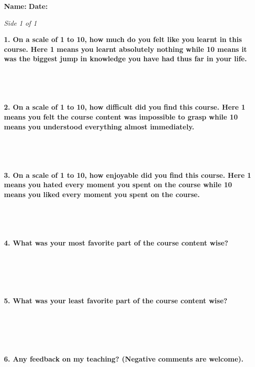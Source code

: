\documentclass[12pt]{article}
\begin{document}
\noindent
\textbf{Name:}\underline{\hspace{6cm}} \hfill \textbf{Date:}\underline{\hspace{3cm}}

\vspace{0.5em}
\noindent\textit{Side 1 of 1}

\vspace{1.5em}
\noindent\textbf{1. On a scale of 1 to 10, how much do you felt like you learnt in this course. Here 1 means you learnt absolutely nothing while 10 means it was the biggest jump in knowledge you have had thus far in your life.}
\\
\\
\\
\\
\\
\noindent\textbf{2. On a scale of 1 to 10, how difficult did you find this course. Here 1 means you felt the course content was impossible to grasp while 10 means you understood everything almost immediately.}
\\
\\
\\
\\
\\
\noindent\textbf{3. On a scale of 1 to 10, how enjoyable did you find this course. Here 1 means you hated every moment you spent on the course while 10 means you liked every moment you spent on the course.}
\\
\\
\\
\\
\\
\noindent\textbf{4. What was your most favorite part of the course content wise?}
\\
\\
\\
\\
\\
\\
\noindent\textbf{5. What was your least favorite part of the course content wise?}
\\
\\
\\
\\
\\
\\
\noindent\textbf{6. Any feedback on my teaching? (Negative comments are welcome).}
\vfill
\end{document}
